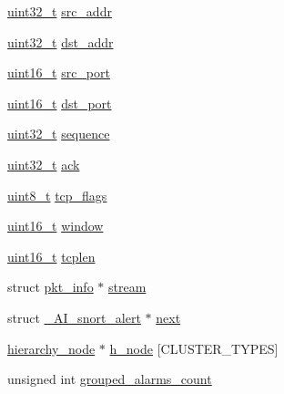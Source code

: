 \begin{DoxyCompactItemize}
\item 
\hyperlink{spp__ai_8h_a435d1572bf3f880d55459d9805097f62}{uint32\_\-t} \hyperlink{struct__AI__snort__alert_ab16a24f368020e4b40e65b53cae33b48}{src\_\-addr}
\item 
\hyperlink{spp__ai_8h_a435d1572bf3f880d55459d9805097f62}{uint32\_\-t} \hyperlink{struct__AI__snort__alert_a69cc2ba171c8c808a0b45caa9426cd8c}{dst\_\-addr}
\item 
\hyperlink{spp__ai_8h_a273cf69d639a59973b6019625df33e30}{uint16\_\-t} \hyperlink{struct__AI__snort__alert_a856cccd3eaabd38aa9974f26d3edc5e3}{src\_\-port}
\item 
\hyperlink{spp__ai_8h_a273cf69d639a59973b6019625df33e30}{uint16\_\-t} \hyperlink{struct__AI__snort__alert_a6b323c07ae501d221e330e13646a96a3}{dst\_\-port}
\item 
\hyperlink{spp__ai_8h_a435d1572bf3f880d55459d9805097f62}{uint32\_\-t} \hyperlink{struct__AI__snort__alert_acb20c4c55149d5806d7523720786ab77}{sequence}
\item 
\hyperlink{spp__ai_8h_a435d1572bf3f880d55459d9805097f62}{uint32\_\-t} \hyperlink{struct__AI__snort__alert_a2b185c678d3a7f1207b2119b0b567c37}{ack}
\item 
\hyperlink{spp__ai_8h_aba7bc1797add20fe3efdf37ced1182c5}{uint8\_\-t} \hyperlink{struct__AI__snort__alert_aa643f11db93b70242b57f0a04775e507}{tcp\_\-flags}
\item 
\hyperlink{spp__ai_8h_a273cf69d639a59973b6019625df33e30}{uint16\_\-t} \hyperlink{struct__AI__snort__alert_a63e94be3d248cf4beb0d4d5ab75331b1}{window}
\item 
\hyperlink{spp__ai_8h_a273cf69d639a59973b6019625df33e30}{uint16\_\-t} \hyperlink{struct__AI__snort__alert_a519a103f5e8f1cb006c0c137b7c6a1c0}{tcplen}
\item 
struct \hyperlink{structpkt__info}{pkt\_\-info} $\ast$ \hyperlink{struct__AI__snort__alert_a09dfe0a841fd3912ec78060d4547cb31}{stream}
\item 
struct \hyperlink{struct__AI__snort__alert}{\_\-AI\_\-snort\_\-alert} $\ast$ \hyperlink{struct__AI__snort__alert_aa8336d4b3359015ed8ea312ca1fd1173}{next}
\item 
\hyperlink{struct__hierarchy__node}{hierarchy\_\-node} $\ast$ \hyperlink{struct__AI__snort__alert_ac53765584296ead1328eabfaba8a3aed}{h\_\-node} \mbox{[}CLUSTER\_\-TYPES\mbox{]}
\item 
unsigned int \hyperlink{struct__AI__snort__alert_a285aff12d6bac03c316ccc5305d28e53}{grouped\_\-alarms\_\-count}
\end{DoxyCompactItemize}



